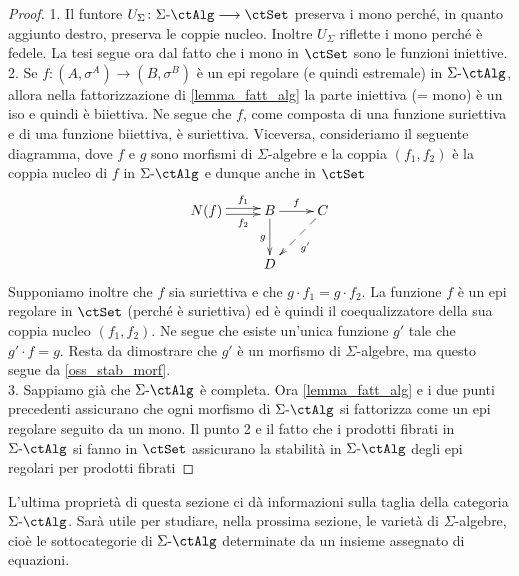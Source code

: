 \begin{proof}
 1. Il funtore \(U_{\Sigma} \colon \ctSAlg \fun \ctSet\) preserva i mono perché, in quanto aggiunto destro, preserva le coppie nucleo.
 Inoltre \(U_{\Sigma}\) riflette i mono perché è fedele. La tesi segue ora dal fatto che i mono in \(\ctSet\) sono le funzioni iniettive. \\
 2. Se \(f \colon (A,\sigma^A) \to (B,\sigma^B)\) è un epi regolare (e quindi estremale) in \(\ctSAlg\), allora nella fattorizzazione di \ref{lemma_fatt_alg} la parte iniettiva (= mono) è un iso e quindi è biiettiva. Ne segue che \(f\), come composta di una funzione
 suriettiva e di una funzione biiettiva, è suriettiva. Viceversa, consideriamo il seguente diagramma, dove \(f\) e \(g\) sono morfismi di
 \(\Sigma\)-algebre e la coppia \((f_1,f_2)\) è la coppia nucleo di \(f\) in \(\ctSAlg\) e dunque anche in \(\ctSet\)
 \[\xymatrix{N(f) \ar@<0.5ex>[r]^-{f_1} \ar@<-0.5ex>[r]_-{f_2} & B \ar[r]^-{f} \ar[d]_{g} & C \ar@{-->}[ld]^{g'} \\ & D}\]
 Supponiamo inoltre che \(f\) sia suriettiva e che \(g \cdot f_1 = g \cdot f_2\). La funzione \(f\) è un epi regolare in \(\ctSet\) (perché è
 suriettiva) ed è quindi il coequalizzatore della sua coppia nucleo \((f_1,f_2)\). Ne segue che esiste un'unica funzione \(g'\) tale che
 \(g' \cdot f = g\). Resta da dimostrare che \(g'\) è un morfismo di \(\Sigma\)-algebre, ma questo segue da \ref{oss_stab_morf}. \\
 3. Sappiamo già che \(\ctSAlg\) è completa. Ora \ref{lemma_fatt_alg} e i due punti precedenti assicurano che ogni
 morfismo di \(\ctSAlg\) si fattorizza come un epi regolare seguito da un mono. Il punto 2 e il fatto che i prodotti fibrati in \(\ctSAlg\) si fanno
 in \(\ctSet\) assicurano la stabilità in \(\ctSAlg\) degli epi regolari per prodotti fibrati
\end{proof}

L'ultima proprietà di questa sezione ci dà informazioni sulla taglia della categoria \(\ctSAlg\). Sarà utile per studiare, nella prossima
sezione, le varietà di \(\Sigma\)-algebre, cioè le sottocategorie di \(\ctSAlg\) determinate da un insieme assegnato di equazioni.

